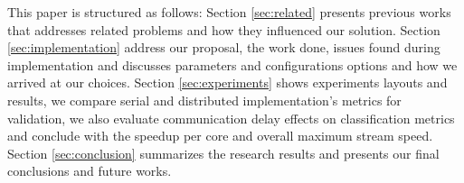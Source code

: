 






This paper is structured as follows:
Section \ref{sec:related} presents previous works that addresses related
problems and how they influenced our solution.
Section \ref{sec:implementation} address our proposal, the work done, issues
found during implementation and discusses parameters and configurations options
and how we arrived at our choices.
Section \ref{sec:experiments} shows experiments layouts and results, we
compare serial and distributed implementation's metrics for validation,
we also evaluate communication delay effects on classification metrics and
conclude with the speedup per core and overall maximum stream speed.
Section \ref{sec:conclusion} summarizes the research results and presents our
final conclusions and future works.
